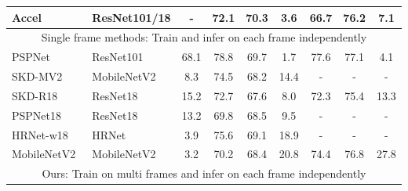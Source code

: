 \documentclass[runningheads]{llncs}
\begin{document}
\begin{table}[h]
\begin{tabular}{l|l|c|c|c|c|c|c|c}
                                     Accel~\cite{jain2019accel}                                       & ResNet101/18                & -                       & 72.1     & 70.3     & 3.6     &66.7    & 76.2   & 7.1    \\\hline
                                              \multicolumn{9}{c}{Single frame methods: Train and infer on each frame independently} \\
                                     \hline
  PSPNet~\cite{zhao2017pyramid} & ResNet101               & 68.1                    & 78.8     &69.7     &  1.7    & 77.6       & 77.1     & 4.1      \\
  SKD-MV2~\cite{liu2019structured}                                     & MobileNetV2               & 8.3                     & 74.5     &68.2     & 14.4     & -       & -      & -       \\
                   SKD-R18~\cite{liu2019structured}                                   & ResNet18                    & 15.2                    & 72.7     & 67.6     &8.0     & 72.3    & 75.4   & 13.3    \\
                   PSPNet18~\cite{zhao2017pyramid}                                    &  ResNet18                    & 13.2                    & 69.8     & 68.5     & 9.5   & -       & -      & -       \\
                   HRNet-w18~\cite{SunXLW19,SunZJCXLMWLW19}                                   & HRNet                     & 3.9                     & 75.6     & 69.1     & 18.9     & -       & -      & -       \\
                   MobileNetV2~\cite{Sandler2018MobileNetV2IR}                                 & MobileNetV2        & 3.2                     & 70.2     & 68.4     & 20.8     & 74.4    & 76.8   & 27.8    \\        \hline

                           \multicolumn{9}{c}{Ours: Train on multi frames and infer on each frame independently} \\

                   \hline


\end{tabular}
\end{table}
\end{document}
